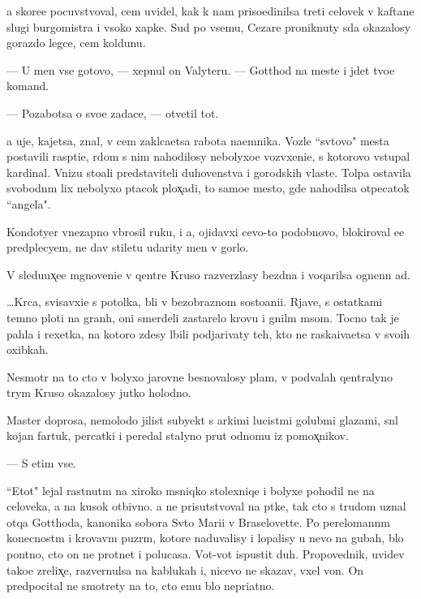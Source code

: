 \documentclass[10pt]{book}
\begin{document}
{\Y}a skore{\y}e pocuvstvoval, cem uvidel, kak k nam priso{\y}edinilsa treti{\y} celovek v kaftane slugi burgomistra i v{\yi}soko{\y} xapke. Sud{\ia} po vsemu, Cezare proniknuty s{\iu}da okazalosy gorazdo legce, cem koldunu.

— U men{\ia} vse gotovo, — xepnul on Valyteru. — Gotthod na meste i jdet tvo{\y}e{\y} komand{\yi}.

— Pozabotsa o svo{\y}e{\y} zadace, — otvetil tot.

{\Y}a uje, kajetsa, znal, v cem zakl{\iu}ca{\y}etsa rabota na{\y}emnika. Vozle ``sv{\ia}tovo" mesta postavili rasp{\ia}ti{\y}e, r{\ia}dom s nim nahodilosy nebolyxo{\y}e vozv{\yi}xeni{\y}e, s kotorovo v{\yi}stupal kardinal. Vnizu sto{\y}ali predstaviteli duhovenstva i gorodskih vlaste{\y}. Tolpa ostavila svobodn{\yi}m lix nebolyxo{\y} p{\ia}tacok plox̨adi, to samo{\y}e mesto, gde nahodilsa otpecatok ``angela".

Kondotyer vnezapno v{\yi}brosil ruku, i {\y}a, ojidavxi{\y} cevo-to podobnovo, blokiroval {\y}e{\y}e predplecyem, ne dav stiletu udarity men{\ia} v gorlo.

V sledu{\y}ux̨e{\y}e mgnoveni{\y}e v qentre Kruso razverzlasy bezdna i voqarilsa ognenn{\yi}{\y} ad.



…Kr{\iu}c{\y}a, svisavxi{\y}e s potolka, b{\yi}li v bezobraznom sosto{\y}ani{\y}i. Rjav{\yi}{\y}e, s ostatkami temno{\y} ploti na gran{\ia}h, oni smerdeli zastarelo{\y} krov{\y}u i gnil{\yi}m m{\ia}som. Tocno tak je pahla i rexetka, na kotoro{\y} zdesy l{\iu}bili podjarivaty teh, kto ne raska{\y}iva{\y}etsa v svo{\y}ih oxibkah.

Nesmotr{\ia} na to cto v bolyxo{\y} jarovne besnovalosy plam{\ia}, v podvalah qentralyno{\y} t{\iu}rym{\yi} Kruso okazalosy jutko holodno.

Master doprosa, nemolodo{\y} jilist{\yi}{\y} subyekt s {\y}arkimi lucist{\yi}mi golub{\yi}mi glazami, sn{\ia}l kojan{\yi}{\y} fartuk, percatki i peredal stalyno{\y} prut odnomu iz pomox̨nikov.

— S etim vse.

``Etot" lejal rast{\ia}nut{\yi}m na xiroko{\y} m{\ia}sniqko{\y} stolexniqe i bolyxe pohodil ne na celoveka, a na kusok otbivno{\y}. {\Y}a ne prisutstvoval na p{\yi}tke, tak cto s trudom uznal otqa Gotthoda, kanonika sobora Sv{\ia}to{\y} Mari{\y}i v Braselovette. Po perelomann{\yi}m konecnost{\ia}m i krovav{\yi}m puz{\yi}r{\ia}m, kotor{\yi}{\y}e naduvalisy i lopalisy u nevo na gubah, b{\yi}lo pon{\ia}tno, cto on ne prot{\ia}net i polucasa. Vot-vot ispustit duh. Propovednik, uvidev tako{\y}e zrelix̨e, razvernulsa na kablukah i, nicevo ne skazav, v{\yi}xel von. On predpocital ne smotrety na to, cto {\y}emu b{\yi}lo nepri{\y}atno.
\end{document}
